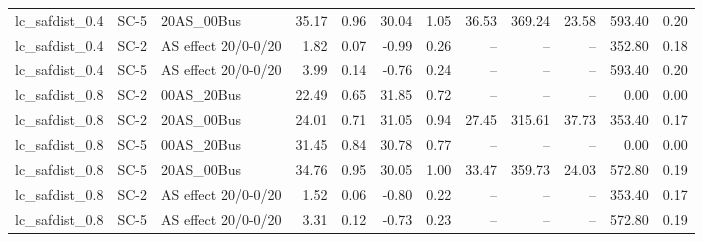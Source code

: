 \begin{table}[htbp]
{\begin{tabular}{lllrrrrrrrrr}
lc\_safdist\_0.4 & SC-5 & 20AS\_00Bus & 35.17 & 0.96 & 30.04 & 1.05 & 36.53 & 369.24 & 23.58 & 593.40 & 0.20 \\
lc\_safdist\_0.4 & SC-2 & AS effect 20/0-0/20 & 1.82 & 0.07 & -0.99 & 0.26 & -- & -- & -- & 352.80 & 0.18 \\
lc\_safdist\_0.4 & SC-5 & AS effect 20/0-0/20 & 3.99 & 0.14 & -0.76 & 0.24 & -- & -- & -- & 593.40 & 0.20 \\
lc\_safdist\_0.8 & SC-2 & 00AS\_20Bus & 22.49 & 0.65 & 31.85 & 0.72 & -- & -- & -- & 0.00 & 0.00 \\
lc\_safdist\_0.8 & SC-2 & 20AS\_00Bus & 24.01 & 0.71 & 31.05 & 0.94 & 27.45 & 315.61 & 37.73 & 353.40 & 0.17 \\
lc\_safdist\_0.8 & SC-5 & 00AS\_20Bus & 31.45 & 0.84 & 30.78 & 0.77 & -- & -- & -- & 0.00 & 0.00 \\
lc\_safdist\_0.8 & SC-5 & 20AS\_00Bus & 34.76 & 0.95 & 30.05 & 1.00 & 33.47 & 359.73 & 24.03 & 572.80 & 0.19 \\
lc\_safdist\_0.8 & SC-2 & AS effect 20/0-0/20 & 1.52 & 0.06 & -0.80 & 0.22 & -- & -- & -- & 353.40 & 0.17 \\
lc\_safdist\_0.8 & SC-5 & AS effect 20/0-0/20 & 3.31 & 0.12 & -0.73 & 0.23 & -- & -- & -- & 572.80 & 0.19 \\
\bottomrule
\end{tabular}}
\end{table}
